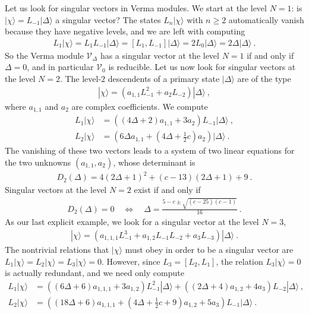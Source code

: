 \documentclass[12pt, a4paper, notitlepage, twoside]{report}
\numberwithin{equation}{section}
\theoremstyle{break}
\begin{document}
Let us look for singular vectors in Verma modules.
We start at the level $N=1$: is $|\chi\rangle=L_{-1}|\Delta\rangle$ a singular vector? The states $L_n|\chi\rangle$ with $n\geq 2$ automatically vanish because they have negative levels, and we are left with computing
\begin{align}
 L_1|\chi\rangle = L_1 L_{-1}|\Delta\rangle = [L_1,L_{-1}]|\Delta\rangle = 2L_0 |\Delta\rangle = 2\Delta|\Delta\rangle\ .
\end{align}
So the Verma module $\mathcal{V}_\Delta$ has a singular vector at the level $N=1$ if and only if $\Delta = 0$, and in particular $\mathcal{V}_0$ is reducible.
Let us now look for singular vectors at the level $N=2$.
The level-$2$ descendents of a primary state $|\Delta\rangle$ are of the type
\begin{align}
 |\chi\rangle = \left(a_{1,1} L_{-1}^2 + a_2 L_{-2}\right) |\Delta\rangle\ ,
\end{align}
where $a_{1,1}$ and $a_2$ are complex coefficients.
We compute 
\begin{align}
 L_1|\chi\rangle &= \left((4\Delta+2)a_{1,1} + 3a_2\right) L_{-1}|\Delta\rangle\ ,
\\
L_2 |\chi \rangle &= \left(6\Delta a_{1,1}+(4\Delta+\tfrac12 c) a_2\right)|\Delta\rangle\ .
\end{align}
The vanishing of these two vectors leads to a system of two linear equations for the two unknowns $(a_{1,1},a_2)$, whose determinant is 
\begin{align}
 D_2(\Delta) = 4(2\Delta+1)^2 +(c-13)(2\Delta+1) +9\ . 
\label{dud}
\end{align}
Singular vectors at the level $N=2$ exist if and only if
\begin{align}
D_2(\Delta)=0 \quad \Leftrightarrow \quad \Delta = \frac{5-c\pm \sqrt{(c-25)(c-1)}}{16}\ .
\label{dcscc}
\end{align}
As our last explicit example, we look for a singular vector at the level $N=3$,
\begin{align}
 |\chi\rangle = \left(a_{1,1,1} L_{-1}^3 + a_{1,2}L_{-1}L_{-2} + a_3 L_{-3}\right) |\Delta\rangle\ .
\end{align}
The nontrivial relations that $|\chi\rangle$ must obey in order to be a singular vector are $L_1|\chi\rangle =L_2|\chi\rangle= L_3 |\chi\rangle=0$.
However, since $L_3 = [L_2,L_1]$, the relation $L_3|\chi\rangle=0$ is actually redundant, and we need only compute
\begin{align}
 L_1|\chi\rangle &= \left((6\Delta+6)a_{1,1,1}+3a_{1,2}\right)L_{-1}^2|\Delta\rangle +\left((2\Delta+4)a_{1,2}+4a_3\right)L_{-2}|\Delta\rangle\ ,
\\
L_2|\chi\rangle &= \left((18\Delta+6)a_{1,1,1}+(4\Delta+\tfrac12c +9)a_{1,2}+5a_3\right)L_{-1}|\Delta\rangle\ .
\end{align}
\end{document}
